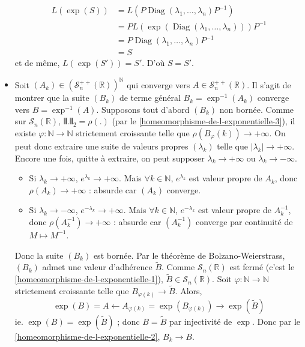 \begin{demonstration}
\begin{itemize}
			\begin{align*}
				L(\exp(S)) &= L(P \operatorname{Diag}(\lambda_1, \dots, \lambda_n) P^{-1}) \\
				&= P L(\exp(\operatorname{Diag}(\lambda_1, \dots, \lambda_n))) P^{-1} \\
				&= P \operatorname{Diag}(\lambda_1, \dots, \lambda_n) P^{-1} \\
				&= S
			\end{align*}
			et de même, $L(\exp(S')) = S'$. D'où $S = S'$.
			\item {} Soit $(A_k) \in (\mathcal{S}^{++}_n(\mathbb{R}))^\mathbb{N}$ qui converge vers $A \in \mathcal{S}^{++}_n(\mathbb{R})$. Il s'agit de montrer que la suite $(B_k)$ de terme général $B_k = \exp^{-1}(A_k)$ converge vers $B = \exp^{-1}(A)$. Supposons tout d'abord $(B_k)$ non bornée. Comme sur $\mathcal{S}_n(\mathbb{R})$, $\VERT . \VERT_2 = \rho(.)$ (par le \cref{homeomorphisme-de-l-exponentielle-3}), il existe $\varphi : \mathbb{N} \rightarrow \mathbb{N}$ strictement croissante telle que $\rho(B_\varphi(k)) \longrightarrow +\infty$. On peut donc extraire une suite de valeurs propres $(\lambda_k)$ telle que $|\lambda_k| \longrightarrow +\infty$. Encore une fois, quitte à extraire, on peut supposer $\lambda_k \longrightarrow +\infty$ ou $\lambda_k \longrightarrow -\infty$.
			\begin{itemize}
				\item Si $\lambda_k \longrightarrow +\infty$, $e^{\lambda_k} \longrightarrow +\infty$. Mais $\forall k \in \mathbb{N}$, $e^{\lambda_k}$ est valeur propre de $A_k$, donc $\rho(A_k) \longrightarrow +\infty$ : absurde car $(A_k)$ converge.
				\item Si $\lambda_k \longrightarrow -\infty$, $e^{-\lambda_k} \longrightarrow +\infty$. Mais $\forall k \in \mathbb{N}$, $e^{-\lambda_k}$ est valeur propre de $A_k^{-1}$, donc $\rho(A_k^{-1}) \longrightarrow +\infty$ : absurde car $(A_k^{-1})$ converge par continuité de $M \mapsto M^{-1}$.
			\end{itemize}
			Donc la suite $(B_k)$ est bornée. Par le théorème de Bolzano-Weierstrass, $(B_k)$ admet une valeur d'adhérence $\widetilde{B}$. Comme $\mathcal{S}_n(\mathbb{R})$ est fermé (c'est le \cref{homeomorphisme-de-l-exponentielle-1}), $\widetilde{B} \in \mathcal{S}_n(\mathbb{R})$.
			\newpar
			Soit $\varphi : \mathbb{N} \rightarrow \mathbb{N}$ strictement croissante telle que $B_{\varphi(k)} \longrightarrow \widetilde{B}$. Alors,
			\[ \exp(B) = A \longleftarrow A_{\varphi(k)} = \exp(B_{\varphi(k)}) \longrightarrow \exp(\widetilde{B}) \]
			ie. $\exp(B) = \exp(\widetilde{B})$ ; donc $B = \widetilde{B}$ par injectivité de $\exp$. Donc par le \cref{homeomorphisme-de-l-exponentielle-2}, $B_k \longrightarrow B$.
		\end{itemize}
	\end{demonstration}

